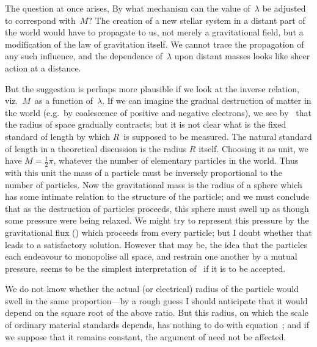 \documentclass[12pt]{book}
\begin{document}
The question at once arises, By what mechanism can the value of~$\lambda$ be
adjusted to correspond with~$M$? The creation of a new stellar system in a
distant part of the world would have to propagate to us, not merely a gravitational
field, but a modification of the law of gravitation itself. We cannot
trace the propagation of any such influence, and the dependence of~$\lambda$ upon
distant masses looks like sheer action at a distance.

But the suggestion is perhaps more plausible if we look at the inverse
relation, viz.\ $M$~as a function of~$\lambda$. If we can imagine the gradual destruction
of matter in the world (e.g.\ by coalescence of positive and negative electrons),
we see by~ that the radius of space gradually contracts; but it is not
clear what is the fixed standard of length by which $R$~is supposed to be
measured. The natural standard of length in a theoretical discussion is the
radius $R$ itself. Choosing it as unit, we have $M = \frac{1}{2}\pi$, whatever the number
of elementary particles in the world. Thus with this unit the mass of a particle
must be inversely proportional to the number of particles. Now the gravitational
mass is the radius of a sphere which has some intimate relation to
the structure of the particle; and we must conclude that as the destruction
of particles proceeds, this sphere must swell up as though some pressure were
being relaxed. We might try to represent this pressure by the gravitational
flux () which proceeds from every particle; but I doubt whether that
leads to a satisfactory solution. However that may be, the idea that the
particles each endeavour to monopolise all space, and restrain one another by
a mutual pressure, seems to be the simplest interpretation of~ if it is to
be accepted.

We do not know whether the actual (or electrical) radius of the particle
would swell in the same proportion---by a rough guess I should anticipate
that it would depend on the square root of the above ratio. But this radius,
on which the scale of ordinary material standards depends, has nothing to do
with equation~; and if we suppose that it remains constant, the argument
of  need not be affected.
\end{document}
